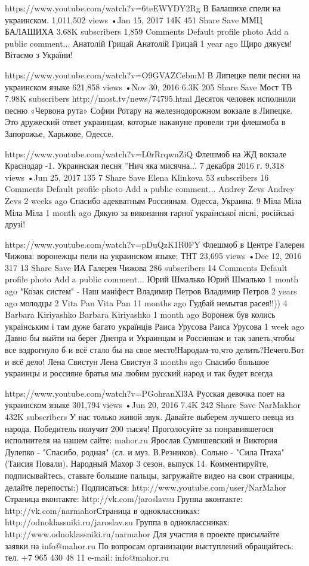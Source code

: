 https://www.youtube.com/watch?v=6teEWYDY2Rg
В Балашихе спели на украинском.
1,011,502 views
•Jan 15, 2017
14K
451
Share
Save
ММЦ БАЛАШИХА
3.68K subscribers
1,859 Comments
Default profile photo
Add a public comment...
Анатолій Грицай
Анатолій Грицай
1 year ago
Щиро дякуєм! Вітаємо з України! 


https://www.youtube.com/watch?v=O9GVAZCebmM
В Липецке пели песни на украинском языке
621,858 views
•Nov 30, 2016
6.3K
205
Share
Save
Мост ТВ
7.98K subscribers
http://most.tv/news/74795.html
Десяток человек исполнили песню «Червона рута» Софии Ротару на железнодорожном вокзале в Липецке. Это дружеский ответ украинцам, которые накануне провели три флешмоба в Запорожье, Харькове, Одессе.

https://www.youtube.com/watch?v=L0rRrqwnZiQ
Флешмоб на ЖД вокзале Краснодар -1. Украинская песня ''Нич яка мисячна..'. 7 декабря 2016 г.
9,318 views
•Jun 25, 2017
135
7
Share
Save
Elena Klinkova
53 subscribers
16 Comments
Default profile photo
Add a public comment...
Andrey Zevs
Andrey Zevs
2 weeks ago
Спасибо адекватным Россиянам. Одесса, Украина.
9
Міла Міла
Міла Міла
1 month ago
Дякую за виконання гарної української пісні, російські друзі! 


https://www.youtube.com/watch?v=pDuQzK1R0FY
Флешмоб в Центре Галереи Чижова: воронежцы пели на украинском языке; ТНТ
23,695 views
•Dec 12, 2016
317
13
Share
Save
ИА Галерея Чижова
286 subscribers
14 Comments
Default profile photo
Add a public comment...
Юрий Шмалько
Юрий Шмалько
1 month ago
"Козак систем" - Наш маніфест
Владимир Петров
Владимир Петров
2 years ago
молодцы
2
Vita Pan
Vita Pan
11 months ago
Гудбай немытая расея!!))
4
Barbara Kiriyashko
Barbara Kiriyashko
1 month ago
Воронеж був колись українським і там дуже багато українців
Раиса Урусова
Раиса Урусова
1 week ago
Давно бы выйти на берег Днепра и Украинцам и Россиянам и так запеть,чтобы все вздрогнуло б и всё стало бы на свое место!Народам-то,что делить?Нечего.Вот и всё дело!
Лена Свистун
Лена Свистун
3 months ago
Спасибо большое украинцы и россияне братья мы любим русский народ и так будет всегда 

https://www.youtube.com/watch?v=PGohranXl3A
Русская девочка поет на украинском языке
301,794 views
•Jun 20, 2016
7.4K
242
Share
Save
NarMakhor
432K subscribers
У нас только живой звук. Давайте выберем лучшего певца из народа. Победитель получит 200 тысяч! Проголосуйте за понравившегося исполнителя на нашем сайте: mahor.ru
Ярослав Сумишевский и Виктория Дулепко - "Спасибо, родная" (сл. и муз. В.Резников). Сольно - "Сила Птаха" (Таисия Повали).
Народный Махор 3 сезон, выпуск 14.
Комментируйте, подписывайтесь, ставьте большие пальцы, загружайте видео на свои страницы, делайте перепосты:)
Подписаться:
http://www.youtube.com/user/NarMahor​
Страница вконтакте:
http://vk.com/jaroslavsu​
Группа вконтакте:
http://vk.com/narmahor​
Страница в одноклассниках:
http://odnoklassniki.ru/jaroslav.su​
Группа в одноклассниках:
http://www.odnoklassniki.ru/narmahor​
Для участия в проекте присылайте заявки на info@mahor.ru
По вопросам организации выступлений обращайтесь:
тел. +7 965 430 48 11
e-mail: info@mahor.ru

